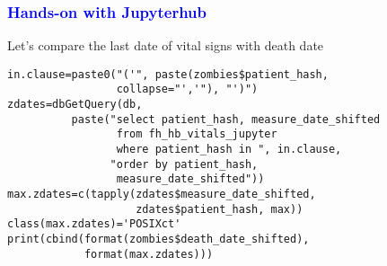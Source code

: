 \documentclass[11pt,pdftex,dvipsnames,usenames]{beamer}
\begin{document}
\begin{frame}[fragile]\frametitle{\bf\textcolor{blue}{Hands-on with Jupyterhub}}
Let's compare the last date of vital signs with death date
\begin{verbatim}
in.clause=paste0("('", paste(zombies$patient_hash, 
                 collapse="','"), "')")
zdates=dbGetQuery(db, 
          paste("select patient_hash, measure_date_shifted 
                 from fh_hb_vitals_jupyter  
                 where patient_hash in ", in.clause, 
                "order by patient_hash, 
                 measure_date_shifted"))           
max.zdates=c(tapply(zdates$measure_date_shifted, 
                    zdates$patient_hash, max))
class(max.zdates)='POSIXct'
print(cbind(format(zombies$death_date_shifted), 
            format(max.zdates)))
\end{verbatim}
\end{frame}
\end{document}
